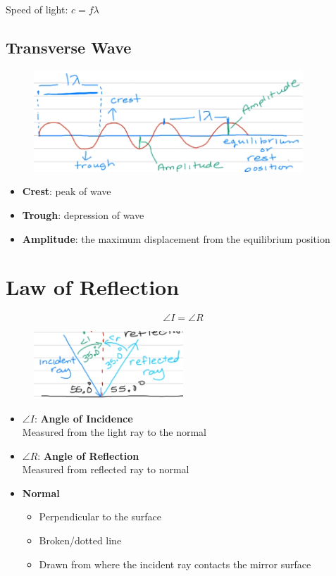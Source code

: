 \documentclass[a4paper,12pt]{article}
\begin{document}
Speed of light: $c = f\lambda$

\subsection{Transverse Wave}
\begin{figure}[H]
    \centering
    \includegraphics[width=0.9\textwidth]{transverse}
\end{figure}
\begin{itemize}
    \item{\textbf{Crest}: peak of wave}
    \item{\textbf{Trough}: depression of wave}
    \item{\textbf{Amplitude}: the maximum displacement from the equilibrium position}
\end{itemize}

\section{Law of Reflection}

\Large $$\angle{I} = \angle{R}$$ \normalsize

\begin{figure}[H]
    \centering
    \includegraphics[width=0.50\textwidth]{reflect}
\end{figure}

\begin{itemize}
    \item{$\angle{I}$: \textbf{Angle of Incidence} \\Measured from the light ray to the normal}
    \item{$\angle{R}$: \textbf{Angle of Reflection} \\Measured from reflected ray to normal}
    \item{
            \textbf{Normal}
            \begin{itemize}
                \item{Perpendicular to the surface}
                \item{Broken/dotted line}
                \item{Drawn from where the incident ray contacts the mirror surface}
            \end{itemize}
        }
\end{itemize}
\end{document}
